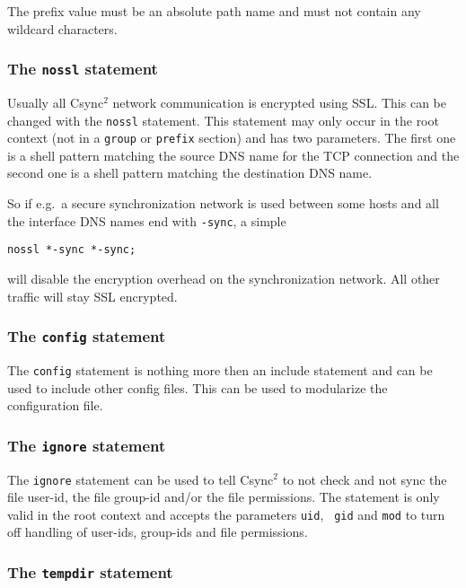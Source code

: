 \documentclass[a4paper,twocolumn]{article}
\def\csync2{{\sc Csync$^{2}$}}
\begin{document}
The prefix value must be an absolute path name and must not contain any
wildcard characters.

\subsubsection{The {\tt nossl} statement}

Usually all \csync2 network communication is encrypted using SSL. This can be
changed with the {\tt nossl} statement. This statement may only occur in the
root context (not in a {\tt group} or {\tt prefix} section) and has two
parameters. The first one is a shell pattern matching the source DNS name for
the TCP connection and the second one is a shell pattern matching the
destination DNS name.

So if e.g.~a secure synchronization network is used between some hosts and
all the interface DNS names end with {\tt -sync}, a simple

\begin{verbatim}
nossl *-sync *-sync;
\end{verbatim}

will disable the encryption overhead on the synchronization network. All other
traffic will stay SSL encrypted.

\subsubsection{The {\tt config} statement}

The {\tt config} statement is nothing more then an include statement and can be
used to include other config files. This can be used to modularize the
configuration file.

\subsubsection{The {\tt ignore} statement}

The {\tt ignore} statement can be used to tell \csync2 to not check and not sync
the file user-id, the file group-id and/or the file permissions. The statement
is only valid in the root context and accepts the parameters {\tt uid}, {\tt
gid} and {\tt mod} to turn off handling of user-ids, group-ids and file
permissions.

\subsubsection{The {\tt tempdir} statement}
\end{document}
